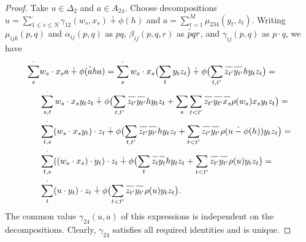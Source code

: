 \documentclass{article}
\theoremstyle{definition}
\newcommand{\dotminus}{\mathbin{\dot{-}}}
\newcommand{\inv}[1]{
    \!\;\overline{
        \!\!\:#1\vphantom !\!\!\:
    }\;\!
}
\begin{document}
\begin{proof}
    Take \(u \in \Delta_2\) and \(a \in A_{24}\). Choose decompositions \(
        u
        =
        \sum_{1 \leq s \leq N}^\cdot
            \gamma_{12}(w_s, x_s)
        \dotplus \phi(h)
    \) and \(
        a = \sum_{t = 1}^M \mu_{234}(y_t, z_t)
    \). Writing \(\mu_{ijk}(p, q)\) and \(\alpha_{ij}(p, q)\) as \(pq\), \(\beta_{ij}(p, q, r)\) as \(\inv pqr\), and \(\gamma_{ij}(p, q)\) as \(p \cdot q\), we have
    \begin{align*}
        \sum_s^\cdot
            &w_s \cdot x_s a
        \dotplus \phi(\inv aha)
        =
        \sum_s^\cdot
            w_s \cdot x_s \bigl(
                \sum_t y_t z_t
            \bigr)
        \dotplus \phi\bigl(
            \sum_{t, t'}
                \inv{z_{t'}} \inv{y_{t'}} h y_t z_t
        \bigr)
        =\\
        &\sum_{s, t}^\cdot w_s \cdot x_s y_t z_t
        \dotplus \phi\bigl(
            \sum_{t, t'}
                \inv{z_{t'}} \inv{y_{t'}} h y_t z_t
            + \sum_s \sum_{t < t'}
                \inv{z_{t'}} \inv{y_{t'}} \inv{x_s}
                \rho(w_s) x_s y_t z_t
        \bigr)
        =\\
        &\sum_{t, s}^\cdot
            (w_s \cdot x_s y_t) \cdot z_t
        \dotplus \phi\bigl(
            \sum_{t, t'}
                \inv{z_{t'}} \inv{y_{t'}} h y_t z_t
            + \sum_{t < t'}
                \inv{z_{t'}} \inv{y_{t'}} \rho(
                    u \dotminus \phi(h)
                ) y_t z_t
        \bigr)
        =\\
        &\sum_{t, s}^\cdot (
            (w_s \cdot x_s) \cdot y_t
        ) \cdot z_t
        \dotplus \phi\bigl(
            \sum_t \inv{z_t} \inv{y_t} h y_t z_t
            + \sum_{t < t'}
                \inv{z_{t'}} \inv{y_{t'}}
                \rho(u) y_t z_t
        \bigr)
        =\\
        &\sum_t^\cdot
            (u \cdot y_t) \cdot z_t
        \dotplus \phi\bigl(
            \sum_{t < t'}
                \inv{z_{t'}} \inv{y_{t'}}
                \rho(u) y_t z_t
        \bigr).
    \end{align*}
    The common value \(\gamma_{24}(u, a)\) of this expressions is independent on the decompositions. Clearly, \(\gamma_{24}\) satisfies all required identities and is unique.
\end{proof}
\end{document}
